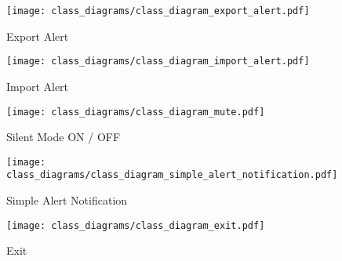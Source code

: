 \begin{figure}[]
	\centering
    \caption{Export Alert}\label{fig:cls_export_alert}
    \texttt{[image: class\_diagrams/class\_diagram\_export\_alert.pdf]}
\end{figure}

\begin{figure}[]
	\centering
    \caption{Import Alert}\label{fig:cls_import_alert}
    \texttt{[image: class\_diagrams/class\_diagram\_import\_alert.pdf]}
\end{figure}

\begin{figure}[]
	\centering
    \caption{Silent Mode ON / OFF}\label{fig:cls_silent_mode}
    \texttt{[image: class\_diagrams/class\_diagram\_mute.pdf]}
\end{figure}

\begin{figure}[]
	\centering
    \caption{Simple Alert Notification}\label{fig:cls_simple_alert_notification}
    \texttt{[image: class\_diagrams/class\_diagram\_simple\_alert\_notification.pdf]}
\end{figure}

\begin{figure}[]
	\centering
    \caption{Exit}\label{fig:cls_exit}
    \texttt{[image: class\_diagrams/class\_diagram\_exit.pdf]}
\end{figure}
